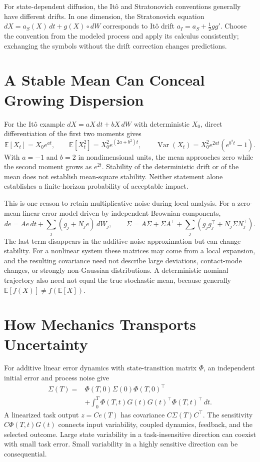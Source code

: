 \documentclass[12pt, openany]{book}
\theoremstyle{plain}
\begin{document}
For state-dependent diffusion, the Itô and Stratonovich conventions generally have different drifts. In one dimension, the Stratonovich equation $dX=a_S(X)\,dt+g(X)\circ dW$ corresponds to Itô drift $a_I=a_S+\tfrac12g g'$. Choose the convention from the modeled process and apply its calculus consistently; exchanging the symbols without the drift correction changes predictions.

\section{A Stable Mean Can Conceal Growing Dispersion}

For the Itô example $dX=aX\,dt+bX\,dW$ with deterministic $X_0$, direct differentiation of the first two moments gives
\begin{equation}
\mathbb E[X_t]=X_0e^{at},\qquad
\mathbb E[X_t^2]=X_0^2e^{(2a+b^2)t},\qquad
\operatorname{Var}(X_t)=X_0^2e^{2at}(e^{b^2t}-1).
\end{equation}
With $a=-1$ and $b=2$ in nondimensional units, the mean approaches zero while the second moment grows as $e^{2t}$. Stability of the deterministic drift or of the mean does not establish mean-square stability. Neither statement alone establishes a finite-horizon probability of acceptable impact.

This is one reason to retain multiplicative noise during local analysis. For a zero-mean linear error model driven by independent Brownian components,
\begin{equation}
de=Ae\,dt+\sum_j(g_j+N_je)\,dW_j,\qquad
\dot\Sigma=A\Sigma+\Sigma A^\top+
\sum_j\left(g_jg_j^\top+N_j\Sigma N_j^\top\right).
\end{equation}
The last term disappears in the additive-noise approximation but can change stability. For a nonlinear system these matrices may come from a local expansion, and the resulting covariance need not describe large deviations, contact-mode changes, or strongly non-Gaussian distributions. A deterministic nominal trajectory also need not equal the true stochastic mean, because generally $\mathbb E[f(X)]\ne f(\mathbb E[X])$.

\section{How Mechanics Transports Uncertainty}

For additive linear error dynamics with state-transition matrix $\Phi$, an independent initial error and process noise give
\begin{equation}
\begin{aligned}
\Sigma(T)={}&\Phi(T,0)\Sigma(0)\Phi(T,0)^\top\\
&+\int_0^T\Phi(T,t)G(t)G(t)^\top\Phi(T,t)^\top\,dt .
\end{aligned}
\end{equation}
A linearized task output $z=C e(T)$ has covariance $C\Sigma(T)C^\top$. The sensitivity $C\Phi(T,t)G(t)$ connects input variability, coupled dynamics, feedback, and the selected outcome. Large state variability in a task-insensitive direction can coexist with small task error. Small variability in a highly sensitive direction can be consequential.
\end{document}

